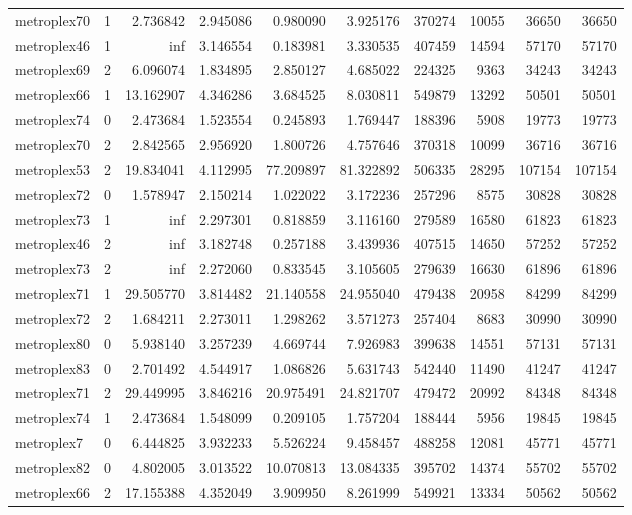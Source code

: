 \documentclass[../../../thesis.tex]{subfiles}
\begin{document}
\begin{longtable}{|l|r|r|r|r|r|r|r|r|r|}
metroplex70 & 1 & 2.736842 & 2.945086 & 0.980090 & 3.925176 & 370274 & 10055 & 36650 & 36650 \\
metroplex46 & 1 & inf & 3.146554 & 0.183981 & 3.330535 & 407459 & 14594 & 57170 & 57170 \\
metroplex69 & 2 & 6.096074 & 1.834895 & 2.850127 & 4.685022 & 224325 & 9363 & 34243 & 34243 \\
metroplex66 & 1 & 13.162907 & 4.346286 & 3.684525 & 8.030811 & 549879 & 13292 & 50501 & 50501 \\
metroplex74 & 0 & 2.473684 & 1.523554 & 0.245893 & 1.769447 & 188396 & 5908 & 19773 & 19773 \\
metroplex70 & 2 & 2.842565 & 2.956920 & 1.800726 & 4.757646 & 370318 & 10099 & 36716 & 36716 \\
metroplex53 & 2 & 19.834041 & 4.112995 & 77.209897 & 81.322892 & 506335 & 28295 & 107154 & 107154 \\
metroplex72 & 0 & 1.578947 & 2.150214 & 1.022022 & 3.172236 & 257296 & 8575 & 30828 & 30828 \\
metroplex73 & 1 & inf & 2.297301 & 0.818859 & 3.116160 & 279589 & 16580 & 61823 & 61823 \\
metroplex46 & 2 & inf & 3.182748 & 0.257188 & 3.439936 & 407515 & 14650 & 57252 & 57252 \\
metroplex73 & 2 & inf & 2.272060 & 0.833545 & 3.105605 & 279639 & 16630 & 61896 & 61896 \\
metroplex71 & 1 & 29.505770 & 3.814482 & 21.140558 & 24.955040 & 479438 & 20958 & 84299 & 84299 \\
metroplex72 & 2 & 1.684211 & 2.273011 & 1.298262 & 3.571273 & 257404 & 8683 & 30990 & 30990 \\
metroplex80 & 0 & 5.938140 & 3.257239 & 4.669744 & 7.926983 & 399638 & 14551 & 57131 & 57131 \\
metroplex83 & 0 & 2.701492 & 4.544917 & 1.086826 & 5.631743 & 542440 & 11490 & 41247 & 41247 \\
metroplex71 & 2 & 29.449995 & 3.846216 & 20.975491 & 24.821707 & 479472 & 20992 & 84348 & 84348 \\
metroplex74 & 1 & 2.473684 & 1.548099 & 0.209105 & 1.757204 & 188444 & 5956 & 19845 & 19845 \\
metroplex7 & 0 & 6.444825 & 3.932233 & 5.526224 & 9.458457 & 488258 & 12081 & 45771 & 45771 \\
metroplex82 & 0 & 4.802005 & 3.013522 & 10.070813 & 13.084335 & 395702 & 14374 & 55702 & 55702 \\
metroplex66 & 2 & 17.155388 & 4.352049 & 3.909950 & 8.261999 & 549921 & 13334 & 50562 & 50562 \\

\end{longtable}
\end{document}
